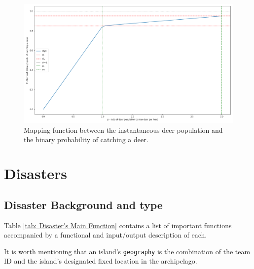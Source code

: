 \begin{figure}[!htb]
    \centering
    \includegraphics[width=1\textwidth]{04_environment/images/deer_pop_prob.png}
    \caption{Mapping function between the instantaneous deer population and the binary probability of catching a deer.}
    \label{fig:Foraging Mapping}
\end{figure}



\newpage
\section{Disasters}
\subsection{Disaster Background and type}

Table \ref{tab: Disaster's Main Function} contains a list of important functions accompanied by a functional and input/output description of each.

It is worth mentioning that an island's \texttt{geography} is the combination of the team ID and the island’s designated fixed location in the archipelago.

